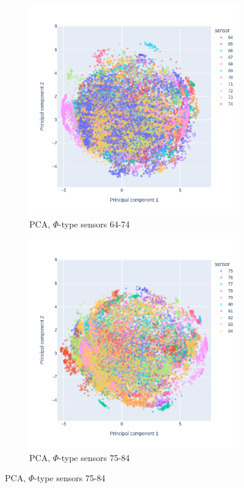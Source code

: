 


 \begin{figure}
\centering
\begin{subfigure}[b]{0.7\textwidth}
    \centering
    \includegraphics[width=\linewidth]{figures/chapter4/dimred/PCA_pedestals_phi_0.png}
    \caption{PCA, $\Phi$-type sensors 64-74}
  \label{plot:PCA_pedestals_0_phi}
  \end{subfigure}
\begin{subfigure}[b]{0.7\textwidth}
    \centering
    \includegraphics[width=\linewidth]{figures/chapter4/dimred/PCA_pedestals_phi_1.png}
    \caption{PCA, $\Phi$-type sensors 75-84}
   \label{plot:PCA_pedestals_1_phi}
  \end{subfigure}


\end{figure}

